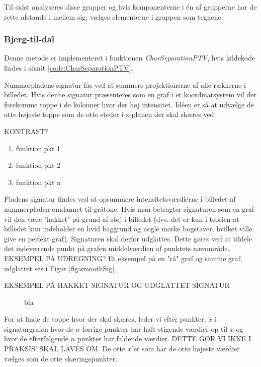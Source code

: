 Til sidst analyseres disse grupper og hvis komponenterne i én af grupperne har de rette afstande i mellem sig, vælges elementerne i gruppen som tegnene.

\subsubsection*{Bjerg-til-dal}

Denne metode er implementeret i funktionen \textit{CharSeparationPTV}, hvis kildekode findes i afsnit \vref{code:CharSeparationPTV}.


Nummerpladens signatur fås ved at summere projektionerne af alle rækkerne i billedet. Hvis denne signatur præsenteres som en graf i et koordinatsystem vil der forekomme toppe i de kolonner hvor der høj intensitet. Idéen er så at udvælge de otte højeste toppe som de otte steder i x-planen der skal skæres ved.

KONTRAST?

\begin{enumerate}
\item funktion pkt 1
\item funktion pkt 2
\item funktion pkt n
\end{enumerate}

Pladens signatur findes ved at opsummere intensitetsværdierne i billedet af nummerpladen omdannet til gråtone. Hvis man betragter signaturen som en graf vil den være "hakket" på grund af støj i billedet (dvs. det er kun i teorien at billedet kun indeholder en hvid baggrund og nogle mørke bogstaver, hvilket ville give en perfekt graf). Signaturen skal derfor udglattes. Dette gøres ved at tildele det indeværende punkt på grafen middelværdien af punktets nærområde. EKSEMPEL PÅ UDREGNING? Et eksempel på en "rå" graf og samme graf, udglattet ses i Figur \vref{fig:smoothSig}.

EKSEMPEL PÅ HAKKET SIGNATUR OG UDGLATTET SIGNATUR

\begin{figure}[htp]
\label{fig:smoothSig}
\caption{bla}
\end{figure}

For at finde de toppe hvor der skal skæres, leder vi efter punkter, $x$ i signaturgrafen hvor de $n$ forrige punkter har haft stigende værdier op til $x$ og hvor de efterfølgende $n$ punkter har faldende værdier. DETTE GØR VI IKKE I PRAKSIS! SKAL LAVES OM. De otte $x$'er som har de otte højeste værdier vælges som de otte skæringspunkter.

